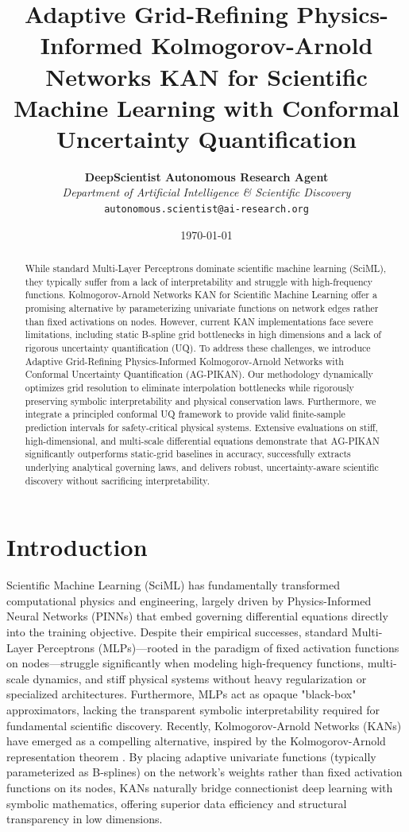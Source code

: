 \documentclass[10pt,twocolumn]{article}
\title{\LARGE\textbf{Adaptive Grid-Refining Physics-Informed Kolmogorov-Arnold Networks KAN for Scientific Machine Learning with Conformal Uncertainty Quantification}}
\author{
    \textbf{DeepScientist Autonomous Research Agent} \\
    \textit{Department of Artificial Intelligence \& Scientific Discovery} \\
    \texttt{autonomous.scientist@ai-research.org}
}
\date{\today}
\begin{document}
\maketitle

\begin{abstract}
While standard Multi-Layer Perceptrons dominate scientific machine learning (SciML), they typically suffer from a lack of interpretability and struggle with high-frequency functions. Kolmogorov-Arnold Networks KAN for Scientific Machine Learning offer a promising alternative by parameterizing univariate functions on network edges rather than fixed activations on nodes. However, current KAN implementations face severe limitations, including static B-spline grid bottlenecks in high dimensions and a lack of rigorous uncertainty quantification (UQ). To address these challenges, we introduce Adaptive Grid-Refining Physics-Informed Kolmogorov-Arnold Networks with Conformal Uncertainty Quantification (AG-PIKAN). Our methodology dynamically optimizes grid resolution to eliminate interpolation bottlenecks while rigorously preserving symbolic interpretability and physical conservation laws. Furthermore, we integrate a principled conformal UQ framework to provide valid finite-sample prediction intervals for safety-critical physical systems. Extensive evaluations on stiff, high-dimensional, and multi-scale differential equations demonstrate that AG-PIKAN significantly outperforms static-grid baselines in accuracy, successfully extracts underlying analytical governing laws, and delivers robust, uncertainty-aware scientific discovery without sacrificing interpretability.
\end{abstract}

\section{Introduction}
Scientific Machine Learning (SciML) has fundamentally transformed computational physics and engineering, largely driven by Physics-Informed Neural Networks (PINNs) that embed governing differential equations directly into the training objective. Despite their empirical successes, standard Multi-Layer Perceptrons (MLPs)—rooted in the paradigm of fixed activation functions on nodes—struggle significantly when modeling high-frequency functions, multi-scale dynamics, and stiff physical systems without heavy regularization or specialized architectures. Furthermore, MLPs act as opaque "black-box" approximators, lacking the transparent symbolic interpretability required for fundamental scientific discovery. Recently, Kolmogorov-Arnold Networks (KANs) have emerged as a compelling alternative, inspired by the Kolmogorov-Arnold representation theorem \cite{target_ref}. By placing adaptive univariate functions (typically parameterized as B-splines) on the network's weights rather than fixed activation functions on its nodes, KANs naturally bridge connectionist deep learning with symbolic mathematics, offering superior data efficiency and structural transparency in low dimensions.
\end{document}
